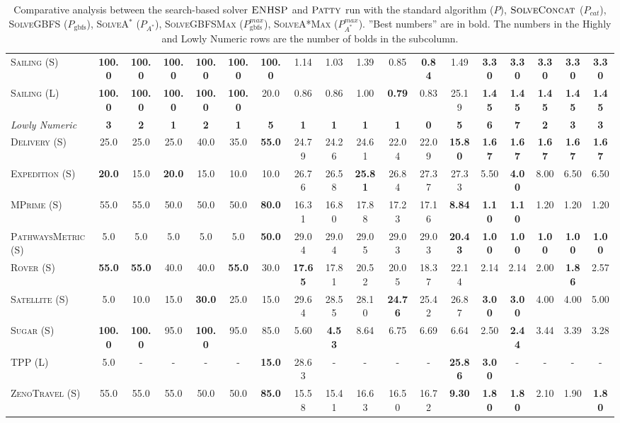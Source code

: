 \documentclass[11pt,landscape]{article}
\begin{document}
\begin{table*}[tb]
{\begin{tabular}{|l||cccccc||cccccc||ccccc||}
\textsc{Sailing} (S)&\textbf{100.0}&\textbf{100.0}&\textbf{100.0}&\textbf{100.0}&\textbf{100.0}&\textbf{100.0}&1.14&1.03&1.39&0.85&\textbf{0.84}&1.49&\textbf{3.30}&\textbf{3.30}&\textbf{3.30}&\textbf{3.30}&\textbf{3.30}\\
\textsc{Sailing} (L)&\textbf{100.0}&\textbf{100.0}&\textbf{100.0}&\textbf{100.0}&\textbf{100.0}&20.0&0.86&0.86&1.00&\textbf{0.79}&0.83&25.19&\textbf{1.45}&\textbf{1.45}&\textbf{1.45}&\textbf{1.45}&\textbf{1.45}
\\\hline
\textit{Lowly Numeric}&\textbf{3}&\textbf{2}&\textbf{1}&\textbf{2}&\textbf{1}&\textbf{5}&\textbf{1}&\textbf{1}&\textbf{1}&\textbf{1}&\textbf{0}&\textbf{5}&\textbf{6}&\textbf{7}&\textbf{2}&\textbf{3}&\textbf{3}\\\hline
\textsc{Delivery} (S)&25.0&25.0&25.0&40.0&35.0&\textbf{55.0}&24.79&24.26&24.61&22.04&22.09&\textbf{15.80}&\textbf{1.67}&\textbf{1.67}&\textbf{1.67}&\textbf{1.67}&\textbf{1.67}\\
\textsc{Expedition} (S)&\textbf{20.0}&15.0&\textbf{20.0}&15.0&10.0&10.0&26.76&26.58&\textbf{25.81}&26.84&27.37&27.33&5.50&\textbf{4.00}&8.00&6.50&6.50\\
\textsc{MPrime} (S)&55.0&55.0&50.0&50.0&50.0&\textbf{80.0}&16.31&16.80&17.88&17.23&17.16&\textbf{8.84}&\textbf{1.10}&\textbf{1.10}&1.20&1.20&1.20\\
\textsc{PathwaysMetric} (S)&5.0&5.0&5.0&5.0&5.0&\textbf{50.0}&29.04&29.04&29.05&29.03&29.03&\textbf{20.43}&\textbf{1.00}&\textbf{1.00}&\textbf{1.00}&\textbf{1.00}&\textbf{1.00}\\
\textsc{Rover} (S)&\textbf{55.0}&\textbf{55.0}&40.0&40.0&\textbf{55.0}&30.0&\textbf{17.65}&17.81&20.52&20.05&18.37&22.14&2.14&2.14&2.00&\textbf{1.86}&2.57\\
\textsc{Satellite} (S)&5.0&10.0&15.0&\textbf{30.0}&25.0&15.0&29.64&28.55&28.10&\textbf{24.76}&25.42&26.87&\textbf{3.00}&\textbf{3.00}&4.00&4.00&5.00\\
\textsc{Sugar} (S)&\textbf{100.0}&\textbf{100.0}&95.0&\textbf{100.0}&95.0&85.0&5.60&\textbf{4.53}&8.64&6.75&6.69&6.64&2.50&\textbf{2.44}&3.44&3.39&3.28\\
\textsc{TPP} (L)&5.0&-&-&-&-&\textbf{15.0}&28.63&-&-&-&-&\textbf{25.86}&\textbf{3.00}&-&-&-&-\\
\textsc{ZenoTravel} (S)&55.0&55.0&55.0&50.0&50.0&\textbf{85.0}&15.58&15.41&16.63&16.50&16.72&\textbf{9.30}&\textbf{1.80}&\textbf{1.80}&2.10&1.90&\textbf{1.80}
\\\hline

        \end{tabular}}
        \caption{Comparative analysis between the search-based solver $\textsc{ENHSP}$ and  $\textsc{Patty}$ run with the standard algorithm ($P$),  $\textsc{SolveConcat}$ ($P_{cat}$), \textsc{SolveGBFS} ($P_\text{gbfs}$), \textsc{SolveA}$^*$ ($P_{A^*}$), \textsc{SolveGBFSMax} ($P_\text{gbfs}^{max}$), \textsc{SolveA*Max} ($P_{A^*}^{max}$). ''Best numbers'' are in bold.  The numbers in the Highly and Lowly Numeric rows are the number of bolds in the subcolumn.}
        \label{tab:experiments}
        \end{table*}
        
\end{document}
